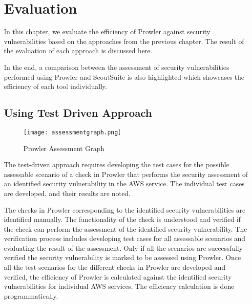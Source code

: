 
\chapter{Evaluation}

\par In this chapter, we evaluate the efficiency of Prowler against security vulnerabilities based on the approaches from the previous chapter. The result of the evaluation of each approach is discussed here.

\par In the end, a comparison between the assessment of security vulnerabilities performed using Prowler and
ScoutSuite is also highlighted which showcases the efficiency of each tool individually.

\section{Using Test Driven Approach}
\begin{figure}
    \centering
    \texttt{[image: assessmentgraph.png]}
    \caption{Prowler Assessment Graph}
    \label{fig:prowlerefficiency}
\end{figure}

\par The test-driven approach requires developing the test cases for the possible assessable scenario of a check in Prowler that performs the security assessment of an identified security vulnerability in the AWS service.
The individual test cases are developed, and their results are noted.

\par The checks in Prowler corresponding to the identified security vulnerabilities are identified manually.
The functionality of the check is understood and verified if the check can perform the assessment of the identified security vulnerability.
The verification process includes developing test cases for all assessable scenarios and evaluating the result of the assessment.
Only if all the scenarios are successfully verified the security vulnerability is marked to be assessed using Prowler.
Once all the test scenarios for the different checks in Prowler are developed and verified, the efficiency of Prowler is calculated against the identified security vulnerabilities for individual AWS services.
The efficiency calculation is done programmatically.

